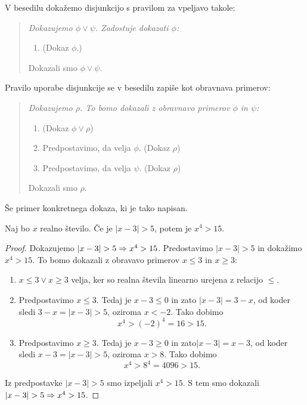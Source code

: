 V besedilu dokažemo disjunkcijo s pravilom za vpeljavo takole:
%
\begin{quote}
  \it
  Dokazujemo $\phi \lor \psi$. Zadostuje dokazati $\phi$:
  \begin{enumerate}
  \item[] (Dokaz $\phi$.)
  \end{enumerate}
  Dokazali smo $\phi \lor \psi$.
\end{quote}
%
Pravilo uporabe disjunkcije se v besedilu zapiše kot obravnava
primerov:
%
\begin{quote}
  \it
  Dokazujemo $\rho$. To bomo dokazali z obravnavo primerov $\phi$ in
  $\psi$:
  \begin{enumerate}
  \item (Dokaz $\phi \lor \rho$)
  \item Predpostavimo, da velja $\phi$. (Dokaz $\rho$)
  \item Predpostavimo, da velja $\psi$. (Dokaz $\rho$)
  \end{enumerate}
  Dokazali smo $\rho$.
\end{quote}
%
Še primer konkretnega dokaza, ki je tako napisan.

\begin{izrek}
  \label{izrek:x-3-5}
  Naj bo $x$ realno število. Če je $|x - 3| > 5$, potem je $x^4 > 15$.
\end{izrek}

\begin{proof}
  Dokazujemo $|x - 3| > 5 \Rightarrow x^4 > 15$. Predostavimo $|x - 3| > 5$
  in dokažimo $x^4 > 15$. To bomo dokazali z obravavo primerov $x \leq
  3$ in $x \geq 3$:
  \begin{enumerate}
  \item $x \leq 3 \lor x \geq 3$ velja, ker so realna števila linearno
    urejena z relacijo $\leq$.
  \item Predpostavimo $x \leq 3$. Tedaj je $x - 3 \leq 0$ in zato $|x
    - 3| = 3 - x$, od koder sledi $3 - x = |x - 3| > 5$, oziroma $x <
    -2$. Tako dobimo
    \begin{equation*}
      x^4 > (-2)^4 = 16 > 15.
    \end{equation*}
  \item Predpostavimo $x \geq 3$. Tedaj je $x - 3 \geq 0$ in zato$|x -
    3| = x - 3$, od koder sledi $x - 3 = |x - 3| > 5$, oziroma $x >
    8$. Tako dobimo
    \begin{equation*}
      x^4 > 8^4 = 4096 > 15.
    \end{equation*}
  \end{enumerate}
  Iz predpostavke $|x - 3| > 5$ smo izpeljali $x^4 > 15$. S tem smo
  dokazali $|x - 3| > 5 \Rightarrow x^4 > 15$.
\end{proof}

